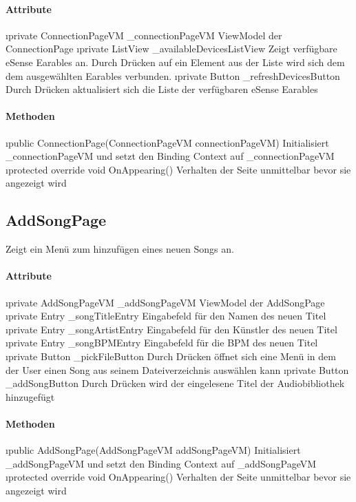 \documentclass[../entwurf.tex]{subfiles}
\begin{document}
\paragraph{Attribute}
\begin{itemize}
	\i{private ConnectionPageVM \_connectionPageVM} ViewModel der ConnectionPage
	\i{private ListView \_availableDevicesListView} Zeigt verfügbare eSense Earables an. Durch Drücken auf ein Element aus der Liste wird sich dem dem ausgewählten Earables verbunden. 
	\i{private Button \_refreshDevicesButton} Durch Drücken aktualisiert sich die Liste der verfügbaren eSense Earables
\end{itemize}

\paragraph{Methoden}
\begin{itemize}
	\i{public ConnectionPage(ConnectionPageVM connectionPageVM)} Initialisiert \_connectionPageVM und setzt den Binding Context 			auf \_connectionPageVM
	\i{protected override void OnAppearing()} Verhalten der Seite unmittelbar bevor sie angezeigt wird
\end{itemize}

\subsection{AddSongPage}
Zeigt ein Menü zum hinzufügen eines neuen Songs an.  
\paragraph{Attribute}
\begin{itemize}
	\i{private AddSongPageVM \_addSongPageVM} ViewModel der AddSongPage
	\i{private Entry \_songTitleEntry} Eingabefeld für den Namen des neuen Titel
	\i{private Entry \_songArtistEntry} Eingabefeld für den Künstler des neuen Titel
	\i{private Entry \_songBPMEntry} Eingabefeld für die BPM des neuen Titel
	\i{private Button \_pickFileButton} Durch Drücken öffnet sich eine Menü in dem der User einen Song aus seinem Dateiverzeichnis auswählen kann
	\i{private Button \_addSongButton} Durch Drücken wird der eingelesene Titel der Audiobibliothek hinzugefügt
\end{itemize}

\paragraph{Methoden}
\begin{itemize}
	\i{public AddSongPage(AddSongPageVM addSongPageVM)} Initialisiert \_addSongPageVM und setzt den Binding Context 			auf \_addSongPageVM
	\i{protected override void OnAppearing()} Verhalten der Seite unmittelbar bevor sie angezeigt wird
\end{itemize}
\end{document}
